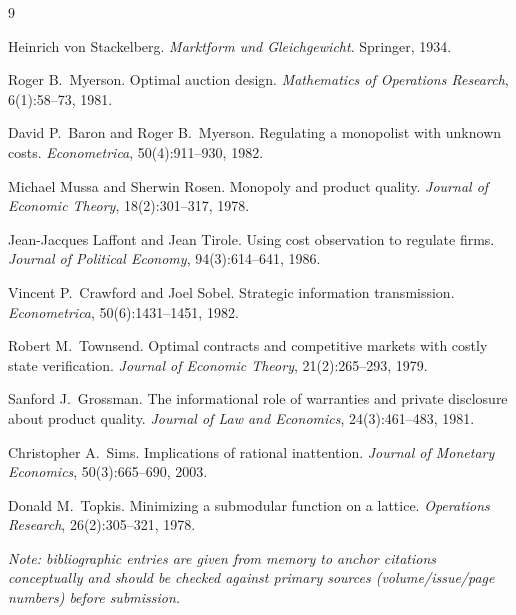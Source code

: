 \documentclass[11pt]{article}
\begin{document}

\begin{thebibliography}{9}

Heinrich von Stackelberg. \textit{Marktform und Gleichgewicht}. Springer, 1934.

Roger B.\ Myerson. Optimal auction design. \textit{Mathematics of Operations
Research}, 6(1):58--73, 1981.

David P.\ Baron and Roger B.\ Myerson. Regulating a monopolist with unknown
costs. \textit{Econometrica}, 50(4):911--930, 1982.

Michael Mussa and Sherwin Rosen. Monopoly and product quality. \textit{Journal
of Economic Theory}, 18(2):301--317, 1978.

Jean-Jacques Laffont and Jean Tirole. Using cost observation to regulate firms.
\textit{Journal of Political Economy}, 94(3):614--641, 1986.

Vincent P.\ Crawford and Joel Sobel. Strategic information transmission.
\textit{Econometrica}, 50(6):1431--1451, 1982.

Robert M.\ Townsend. Optimal contracts and competitive markets with costly state
verification. \textit{Journal of Economic Theory}, 21(2):265--293, 1979.

Sanford J.\ Grossman. The informational role of warranties and private
disclosure about product quality. \textit{Journal of Law and Economics},
24(3):461--483, 1981.

Christopher A.\ Sims. Implications of rational inattention. \textit{Journal of
Monetary Economics}, 50(3):665--690, 2003.

Donald M.\ Topkis. Minimizing a submodular function on a lattice.
\textit{Operations Research}, 26(2):305--321, 1978.

\end{thebibliography}

\vspace{1em}
\noindent\textit{Note: bibliographic entries are given from memory to anchor
citations conceptually and should be checked against primary sources
(volume/issue/page numbers) before submission.}
\end{document}

